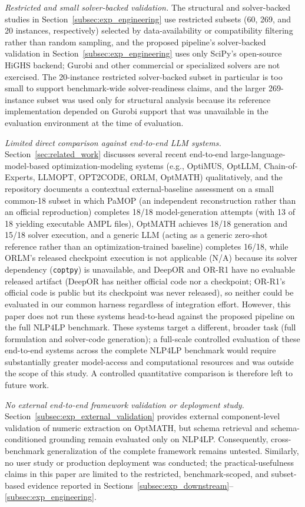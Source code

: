 \documentclass[3p]{elsarticle}
\begin{document}
\emph{Restricted and small solver-backed validation.} The structural and solver-backed studies in Section~\ref{subsec:exp_engineering} use restricted subsets (60, 269, and 20 instances, respectively) selected by data-availability or compatibility filtering rather than random sampling, and the proposed pipeline's solver-backed validation in Section~\ref{subsec:exp_engineering} uses only SciPy's open-source HiGHS backend; Gurobi and other commercial or specialized solvers are not exercised. The 20-instance restricted solver-backed subset in particular is too small to support benchmark-wide solver-readiness claims, and the larger 269-instance subset was used only for structural analysis because its reference implementation depended on Gurobi support that was unavailable in the evaluation environment at the time of evaluation.

\emph{Limited direct comparison against end-to-end LLM systems.} Section~\ref{sec:related_work} discusses several recent end-to-end large-language-model-based optimization-modeling systems (e.g., OptiMUS, OptLLM, Chain-of-Experts, LLMOPT, OPT2CODE, ORLM, OptMATH) qualitatively, and the repository documents a contextual external-baseline assessment on a small common-18 subset in which PaMOP (an independent reconstruction rather than an official reproduction) completes 18/18 model-generation attempts (with 13 of 18 yielding executable AMPL files), OptMATH achieves 18/18 generation and 15/18 solver execution, and a generic LLM (acting as a generic zero-shot reference rather than an optimization-trained baseline) completes 16/18, while ORLM's released checkpoint execution is not applicable (N/A) because its solver dependency (\texttt{coptpy}) is unavailable, and DeepOR and OR-R1 have no evaluable released artifact (DeepOR has neither official code nor a checkpoint; OR-R1's official code is public but its checkpoint was never released), so neither could be evaluated in our common harness regardless of integration effort. However, this paper does not run these systems head-to-head against the proposed pipeline on the full \textsc{NLP4LP} benchmark. These systems target a different, broader task (full formulation and solver-code generation); a full-scale controlled evaluation of these end-to-end systems across the complete \textsc{NLP4LP} benchmark would require substantially greater model-access and computational resources and was outside the scope of this study. A controlled quantitative comparison is therefore left to future work.

\emph{No external end-to-end framework validation or deployment study.} Section~\ref{subsec:exp_external_validation} provides external component-level validation of numeric extraction on OptMATH, but schema retrieval and schema-conditioned grounding remain evaluated only on NLP4LP. Consequently, cross-benchmark generalization of the complete framework remains untested. Similarly, no user study or production deployment was conducted; the practical-usefulness claims in this paper are limited to the restricted, benchmark-scoped, and subset-based evidence reported in Sections~\ref{subsec:exp_downstream}--\ref{subsec:exp_engineering}.
\end{document}
